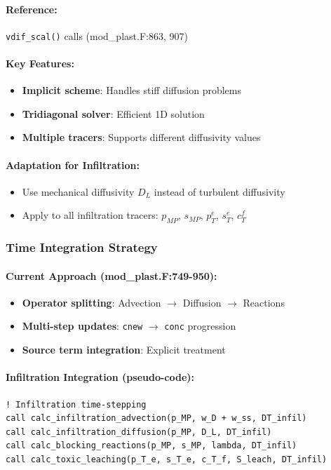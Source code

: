 \documentclass[11pt,a4paper]{article}
\begin{document}
\paragraph{Reference:} \texttt{vdif\_scal()} calls (mod\_plast.F:863, 907)

\paragraph{Key Features:}
\begin{itemize}
    \item \textbf{Implicit scheme}: Handles stiff diffusion problems
    \item \textbf{Tridiagonal solver}: Efficient 1D solution
    \item \textbf{Multiple tracers}: Supports different diffusivity values
\end{itemize}

\paragraph{Adaptation for Infiltration:}
\begin{itemize}
    \item Use mechanical diffusivity $D_L$ instead of turbulent diffusivity
    \item Apply to all infiltration tracers: $p_{MP}$, $s_{MP}$, $p_T^e$, $s_T^e$, $c_T^f$
\end{itemize}

\subsubsection{Time Integration Strategy}

\paragraph{Current Approach (mod\_plast.F:749-950):}
\begin{itemize}
    \item \textbf{Operator splitting}: Advection $\rightarrow$ Diffusion $\rightarrow$ Reactions
    \item \textbf{Multi-step updates}: \texttt{cnew} $\rightarrow$ \texttt{conc} progression
    \item \textbf{Source term integration}: Explicit treatment
\end{itemize}

\paragraph{Infiltration Integration (pseudo-code):}
\begin{verbatim}
! Infiltration time-stepping
call calc_infiltration_advection(p_MP, w_D + w_ss, DT_infil)
call calc_infiltration_diffusion(p_MP, D_L, DT_infil)  
call calc_blocking_reactions(p_MP, s_MP, lambda, DT_infil)
call calc_toxic_leaching(p_T_e, s_T_e, c_T_f, S_leach, DT_infil)
\end{verbatim}
\end{document}
